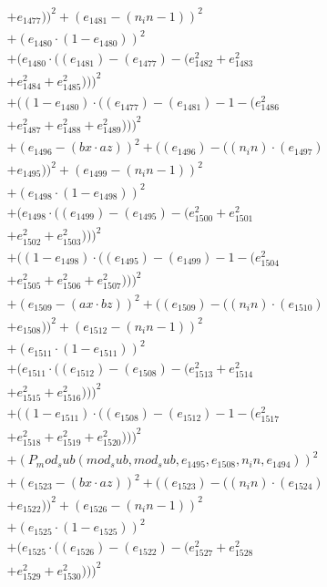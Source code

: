 \documentclass[10pt, a4paper]{article}
\begin{document}
\begin{small}
\begin{align*}
& + e_{1477}))^{2} + (e_{1481} - (n_in - 1))^{2} \\
& + (e_{1480}  \cdot  (1 - e_{1480}))^{2} \\
& + (e_{1480}  \cdot  ((e_{1481}) - (e_{1477}) - (e_{1482}^{2} + e_{1483}^{2} \\
& + e_{1484}^{2} + e_{1485}^{2})))^{2} \\
& + ((1 - e_{1480})  \cdot  ((e_{1477}) - (e_{1481}) - 1 - (e_{1486}^{2} \\
& + e_{1487}^{2} + e_{1488}^{2} + e_{1489}^{2})))^{2} \\
& + (e_{1496} - (bx  \cdot  az))^{2} + ((e_{1496}) - ((n_in)  \cdot  (e_{1497}) \\
& + e_{1495}))^{2} + (e_{1499} - (n_in - 1))^{2} \\
& + (e_{1498}  \cdot  (1 - e_{1498}))^{2} \\
& + (e_{1498}  \cdot  ((e_{1499}) - (e_{1495}) - (e_{1500}^{2} + e_{1501}^{2} \\
& + e_{1502}^{2} + e_{1503}^{2})))^{2} \\
& + ((1 - e_{1498})  \cdot  ((e_{1495}) - (e_{1499}) - 1 - (e_{1504}^{2} \\
& + e_{1505}^{2} + e_{1506}^{2} + e_{1507}^{2})))^{2} \\
& + (e_{1509} - (ax  \cdot  bz))^{2} + ((e_{1509}) - ((n_in)  \cdot  (e_{1510}) \\
& + e_{1508}))^{2} + (e_{1512} - (n_in - 1))^{2} \\
& + (e_{1511}  \cdot  (1 - e_{1511}))^{2} \\
& + (e_{1511}  \cdot  ((e_{1512}) - (e_{1508}) - (e_{1513}^{2} + e_{1514}^{2} \\
& + e_{1515}^{2} + e_{1516}^{2})))^{2} \\
& + ((1 - e_{1511})  \cdot  ((e_{1508}) - (e_{1512}) - 1 - (e_{1517}^{2} \\
& + e_{1518}^{2} + e_{1519}^{2} + e_{1520}^{2})))^{2} \\
& + (P_mod_sub(mod_sub, mod_sub, e_{1495}, e_{1508}, n_in, e_{1494}))^{2} \\
& + (e_{1523} - (bx  \cdot  az))^{2} + ((e_{1523}) - ((n_in)  \cdot  (e_{1524}) \\
& + e_{1522}))^{2} + (e_{1526} - (n_in - 1))^{2} \\
& + (e_{1525}  \cdot  (1 - e_{1525}))^{2} \\
& + (e_{1525}  \cdot  ((e_{1526}) - (e_{1522}) - (e_{1527}^{2} + e_{1528}^{2} \\
& + e_{1529}^{2} + e_{1530}^{2})))^{2} \\

\end{align*}
\end{small}
\end{document}
